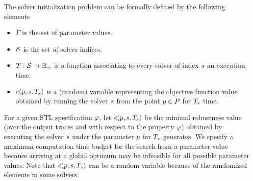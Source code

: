 The solver initialization problem can be formally defined by the following elements
\begin{itemize}
\item $\Gamma$ is the set of parameter values.
\item $\mathcal{S}$ is the set of solver indices.
\item $T : \mathcal{S} \to \mathbb{R}_+$ is a function associating to every solver of index $s$ an execution time.
\item $c(p, s, T_{s})$ is a (random) variable representing the objective function value obtained by running the solver $s$ from the point $p \in P$ for $T_{s}$ time. 
\end{itemize}

For a given STL specification $\varphi$, let $c(p, s, T_{s})$ be the minimal robustness value (over the output traces and with respect to the property $\varphi$) obtained by executing the solver $s$ under the parameter $p$ for $T_{s}$ generates. We specify a maximum computation time budget for the search from a parameter value because arriving at a global optimum may be infeasible for all possible parameter values. Note that $c(p, s, T_{s})$ can be a random variable because of the randomized elements in some solvers. 

